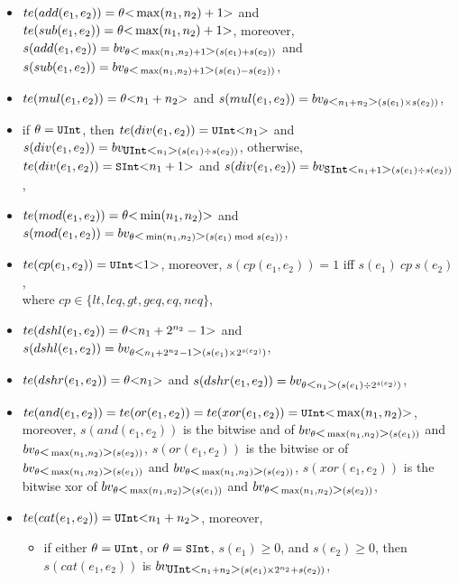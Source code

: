 {\begin{itemize}
\begin{itemize}
\item $te(add(e_1, e_2)) =\theta \mbox{<} \max(n_1, n_2)+1 \mbox{>}$ and $te(sub(e_1, e_2)) = \theta \mbox{<} \max(n_1, n_2)+1 \mbox{>}$, moreover, $s(add(e_1, e_2)) = bv_{\theta \mbox{<} \max(n_1,n_2)+1 \mbox{>} (s(e_1) + s(e_2))}$ and \\
$s(sub(e_1, e_2)) = bv_{\theta \mbox{<} \max(n_1,n_2)+1 \mbox{>} (s(e_1) - s(e_2))}$,
%
\item $te(mul(e_1, e_2)) = \theta \mbox{<} n_1+n_2 \mbox{>}$ and $s(mul(e_1, e_2)) = bv_{\theta \mbox{<} n_1+n_2 \mbox{>} (s(e_1) \times s(e_2))}$,
%
\item  if $\theta = \mbox{\prettyll{UInt}}$, then $te(div(e_1, e_2)) =\mbox{\prettyll{UInt}} \bwidth{n_1}$ and $s(div(e_1, e_2)) = bv_{\mbox{\prettyll{UInt}} \bwidth{n_1} (s(e_1) \div s(e_2))}$, otherwise, $te(div(e_1, e_2)) = \mbox{\prettyll{SInt}} \bwidth{n_1+1}$ and $s(div(e_1, e_2)) = bv_{\mbox{\prettyll{SInt}} \bwidth{n_1+1} (s(e_1) \div s(e_2))}$,
%
\item $te(mod(e_1, e_2)) = \theta \mbox{<} \min(n_1,n_2) \mbox{>}$ and $s(mod(e_1, e_2)) = bv_{\theta \mbox{<} \min(n_1,n_2) \mbox{>} (s(e_1) \bmod s(e_2))}$,
%
\item $te(cp(e_1, e_2)) = \mbox{\prettyll{UInt}} \bwidth{1}$, moreover, $s(cp(e_1, e_2)) = 1$ iff $s(e_1)\ cp\ s(e_2)$, \\ where $cp \in \{lt, leq, gt, geq, eq, neq\}$,
%
\item $te(dshl(e_1, e_2)) = \theta \mbox{<} n_1+2^{n_2}-1 \mbox{>}$ and $s(dshl(e_1, e_2)) = bv_{\theta \mbox{<} n_1+2^{n_2}-1 \mbox{>}(s(e_1) \times 2^{s(e_2)})}$,
%
\item $te(dshr(e_1, e_2)) = \theta \mbox{<} n_1 \mbox{>}$ and $s(dshr(e_1, e_2)) = bv_{\theta \mbox{<} n_1 \mbox{>}(s(e_1) \div 2^{s(e_2)})}$,
%
\item $te(and(e_1, e_2)) = te(or(e_1, e_2)) =  te(xor(e_1, e_2)) = \mbox{\prettyll{UInt}} \bwidth{\max(n_1, n_2)}$, moreover,
$s(and(e_1, e_2))$ is the bitwise and of $bv_{\theta\mbox{<} \max(n_1, n_2) \mbox{>}(s(e_1))}$ and $bv_{\theta\mbox{<} \max(n_1, n_2) \mbox{>}(s(e_2))}$,  $s(or(e_1, e_2))$ is the bitwise or of $bv_{\theta\mbox{<} \max(n_1, n_2) \mbox{>}(s(e_1))}$ and $bv_{\theta\mbox{<} \max(n_1, n_2) \mbox{>}(s(e_2))}$, $s(xor(e_1, e_2))$ is the bitwise xor of $bv_{\theta\mbox{<} \max(n_1, n_2) \mbox{>}(s(e_1))}$ and $bv_{\theta\mbox{<} \max(n_1, n_2) \mbox{>}(s(e_2))}$,
%
\item $te(cat(e_1, e_2)) = \mbox{\prettyll{UInt}} \bwidth{n_1 + n_2}$, moreover,
\begin{itemize}
\item if either $\theta = \mbox{\prettyll{UInt}}$, or $\theta=\mbox{\prettyll{SInt}}$, $s(e_1) \ge 0$, and $s(e_2) \ge 0$, then \\ $s(cat(e_1, e_2))$ is $bv_{\mbox{\prettyll{UInt}}\bwidth{n_1+n_2}(s(e_1) \times 2^{n_2} + s(e_2))}$,

\end{itemize}
\end{itemize}
\end{itemize}}
